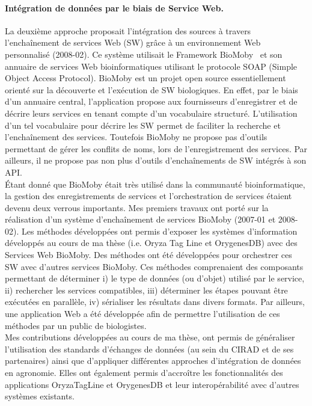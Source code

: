\paragraph*{Intégration de données par le biais de Service Web.} La deuxième approche proposait l’intégration des sources à travers l’enchaînement de services Web (SW) grâce à un environnement Web personnalisé (2008-02). Ce système utilisait le Framework BioMoby~\cite{Wilkinson2002a,Wilkinson2005a}  et son annuaire de services Web bioinformatiques utilisant le protocole SOAP  (Simple Object Access Protocol). BioMoby est un projet open source essentiellement orienté sur la découverte et l’exécution de SW biologiques. En effet, par le biais d’un annuaire central, l’application propose aux fournisseurs d’enregistrer et de décrire leurs services en tenant compte d’un vocabulaire structuré. L’utilisation d’un tel vocabulaire pour décrire les SW permet de faciliter la recherche et l’enchaînement des services. Toutefois BioMoby ne propose pas d’outils permettant de gérer les conflits de noms, lors de l'enregistrement des services. Par ailleurs, il ne propose pas non plus d'outils d’enchaînements de SW intégrés à son API. \\
Étant donné que BioMoby était très utilisé dans la communauté bioinformatique, la gestion des enregistrements de services et l'orchestration de services étaient devenu deux verrous importants. Mes premiers travaux ont porté sur la réalisation d'un système d'enchaînement de services BioMoby (2007-01 et 2008-02). Les méthodes développées ont permis d'exposer les systèmes d'information développés au cours de ma thèse (i.e. Oryza Tag Line et OrygenesDB) avec des Services Web BioMoby. Des méthodes ont été développées pour orchestrer ces SW avec d'autres services BioMoby. Ces méthodes comprenaient des composants permettant de déterminer i) le type de données (ou d'objet) utilisé par le service, ii) rechercher les services compatibles, iii) déterminer les étapes pouvant être exécutées en parallèle,  iv) sérialiser les résultats dans divers formats. Par ailleurs, une application Web a été développée afin de permettre l'utilisation de ces méthodes par un public de biologistes. \\

Mes contributions développées au cours de ma thèse, ont permis de généraliser l’utilisation des standards d’échanges de données (au sein du CIRAD et de ses partenaires) ainsi que d’appliquer différentes approches d’intégration de données en agronomie. Elles ont également permis d’accroître les fonctionnalités des applications OryzaTagLine et OrygenesDB et leur interopérabilité avec d’autres systèmes existants.

